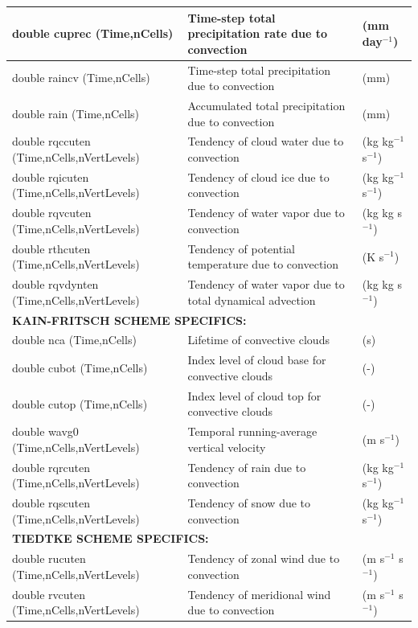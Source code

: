 \documentclass[11pt]{report}
\begin{document}
{\small
\begin{longtable}{|p{2.0in} |p{3.0in} |p{1.0in} |}
\hline
        double cuprec (Time,nCells) & Time-step total precipitation rate due to convection & (mm day$^{-1}$) \\ \hline
        double raincv (Time,nCells)  & Time-step total precipitation due to convection & (mm) \\ \hline
        double rain (Time,nCells)      & Accumulated total precipitation due to convection & (mm) \\ \hline
        double rqccuten \hfil\break (Time,nCells,nVertLevels) & Tendency of cloud water due to convection &  (kg kg$^{-1}$ s$^{-1}$) \\ \hline
        double rqicuten \hfil\break (Time,nCells,nVertLevels) & Tendency of cloud ice due to convection & (kg kg$^{-1}$ s$^{-1}$) \\ \hline
        double rqvcuten \hfil\break (Time,nCells,nVertLevels) & Tendency of water vapor due to convection & (kg kg s$^{-1}$) \\ \hline
        double rthcuten \hfil\break (Time,nCells,nVertLevels) & Tendency of potential temperature due to convection & (K s$^{-1}$) \\ \hline
        double rqvdynten \hfil\break (Time,nCells,nVertLevels) & Tendency of water vapor due to total dynamical advection & (kg kg s$^{-1}$)\\ \hline
        \multicolumn{3}{|l|}{{\rule[-3mm]{0mm}{8mm}\bf KAIN-FRITSCH SCHEME SPECIFICS:} \hfill}\\ \hline
         double nca (Time,nCells) & Lifetime of convective clouds & (s) \\ \hline
        double cubot (Time,nCells) & Index level of cloud base for convective clouds & (-) \\ \hline
        double cutop (Time,nCells) & Index level of cloud top for convective clouds & (-) \\ \hline
        double wavg0 \hfil\break (Time,nCells,nVertLevels) & Temporal running-average vertical velocity & (m s$^{-1}$) \\ \hline
        double rqrcuten \hfil\break (Time,nCells,nVertLevels) & Tendency of rain due to convection &  (kg kg$^{-1}$ s$^{-1}$) \\ \hline
        double rqscuten \hfil\break (Time,nCells,nVertLevels) & Tendency of snow due to convection & (kg kg$^{-1}$ s$^{-1}$) \\ \hline
        \multicolumn{3}{|l|}{{\rule[-3mm]{0mm}{8mm}\bf TIEDTKE SCHEME SPECIFICS:} \hfill}\\ \hline
        double rucuten \hfil\break (Time,nCells,nVertLevels) & Tendency of zonal wind due to convection & (m s$^{-1}$ s$^{-1}$) \\ \hline
        double rvcuten \hfil\break (Time,nCells,nVertLevels) & Tendency of meridional wind due to convection & (m s$^{-1}$ s$^{-1}$) \\ \hline
\end{longtable}
}
\end{document}
